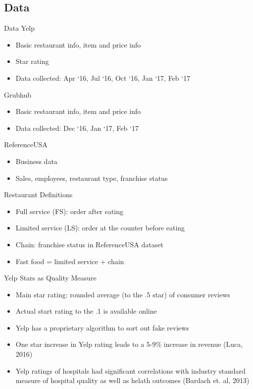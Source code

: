 \documentclass[xcolor=table]{beamer}
\begin{document}
\begin{spacing}{1.2}
\section{Data}

\begin{frame}{Data}
Yelp 
\begin{itemize}
\item Basic restaurant info, item and price info
\item Star rating 
\item Data collected: Apr `16, Jul `16, Oct `16, Jan `17, Feb `17
\end{itemize}

Grubhub
\begin{itemize}
\item Basic restaurant info, item and price info
\item Data collected: Dec `16, Jan `17, Feb `17
\end{itemize}

ReferenceUSA
\begin{itemize}
\item Business data
\item Sales, employees, restaurant type, franchise status
\end{itemize}

\end{frame}


\begin{frame}{Restaurant Definitions}

\begin{itemize}
\item Full service (FS): order after eating
\item Limited service (LS): order at the counter before eating
\item Chain: franchise status in ReferenceUSA dataset
\item Fast food = limited service + chain 
\end{itemize}
\end{frame}

\begin{frame}{Yelp Stars as Quality Measure}
\begin{itemize}
\item Main star rating: rounded average (to the .5 star) of consumer reviews
\item Actual start rating to the .1 is available online
\item Yelp has a proprietary algorithm to sort out fake reviews
\item One star increase in Yelp rating leads to a 5-9\% increase in revenue (Luca, 2016)
\item Yelp ratings of hospitals had significant correlations with industry standard measure of hospital quality as well as helath outcomes (Bardach et. al, 2013)
\end{itemize}
\end{frame}


\end{spacing}
\end{document}

